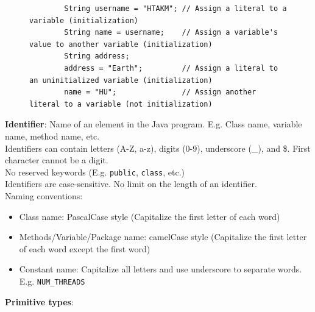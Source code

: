 \documentclass{article}
\begin{document}
\begin{figure}[h]
	\begin{verbatim}
		String username = "HTAKM"; // Assign a literal to a variable (initialization)
		String name = username;    // Assign a variable's value to another variable (initialization)
		String address;
		address = "Earth";         // Assign a literal to an uninitialized variable (initialization)
		name = "HU";               // Assign another literal to a variable (not initialization)
	\end{verbatim}
\end{figure}

\textbf{Identifier}: Name of an element in the Java program. E.g. Class name, variable name, method name, etc.\\
Identifiers can contain letters (A-Z, a-z), digits (0-9), underscore (\_), and \$. First character cannot be a digit.\\
No reserved keywords (E.g. \texttt{public}, \texttt{class}, etc.)\\
Identifiers are case-sensitive. No limit on the length of an identifier.\\
Naming conventions:
\begin{itemize}
	\item Class name: PascalCase style (Capitalize the first letter of each word)
	\item Methods/Variable/Package name: camelCase style (Capitalize the first letter of each word except the first word)
	\item Constant name: Capitalize all letters and use underscore to separate words. E.g. \texttt{NUM\_THREADS}
\end{itemize}
\textbf{Primitive types}:
\end{document}

